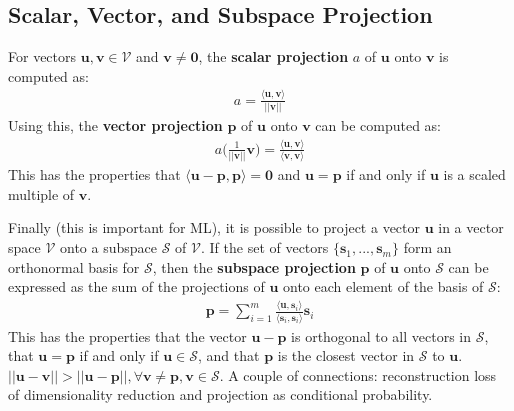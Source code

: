 \documentclass{harvardml}
\theoremstyle{definition}
\theoremstyle{plain}
\renewcommand{\v}[1]{\mathbf{#1}}
\begin{document}
    \subsection{Scalar, Vector, and Subspace Projection}
        For vectors $\v u, \v v \in \mathcal{V}$ and $\v v \neq \v 0$, the 
        \textbf{scalar projection} $a$ of $\v u$ onto $\v v$ is computed as:
            \begin{align*}
                a = \frac{\langle \v u, \v v \rangle}{||\v v||}
            \end{align*}
        \noindent Using this, the \textbf{vector projection} 
		$\v p$ of $\v u$ onto $\v v$ can be computed as:
            \begin{align*}
                a\big(\frac{1}{||\v v||}\v v\big) = 
                \frac{\langle \v u, \v v \rangle}
				{\langle \v v, \v v \rangle}
            \end{align*}
        \noindent This has the properties that $\langle \v u - \v p,
		\v p \rangle = \v 0$ and $\v u = \v p$ if and only if $\v u$ 
		is a scaled multiple of $\v v$.

        \noindent Finally (this is important for ML), it is possible
        to project a vector $\v u$ in a vector space $\mathcal{V}$ onto a
        subspace  $\mathcal{S}$ of $\mathcal{V}$. If the set of vectors
        $\{\v s_1,...,\v s_m\}$ form an orthonormal basis for $\mathcal{S}$,
        then the \textbf{subspace projection} $\v p$ of $\v u$ onto 
		$\mathcal{S}$ can be expressed as the sum of the projections of 
		$\v u$ onto each element of the basis of $\mathcal{S}$:
            \begin{align*}
                \v p = \sum_{i=1}^m 
				\frac{\langle \v u, \v s_i \rangle}
                {\langle \v s_i, \v s_i \rangle} \v s_i
            \end{align*}
        \noindent This has the properties that the vector 
		$\v u - \v p$ is orthogonal to all vectors in $\mathcal{S}$, 
		that $\v u = \v p$ if and only if $\v u \in \mathcal{S}$, and 
		that $\v p$ is the closest vector in $\mathcal{S}$ to $\v u$.
        $|| \v u - \v v || > || \v u - \v p ||, \forall \v v \neq \v p, 
		\v v \in \mathcal{S}$. A couple of connections: reconstruction 
		loss of dimensionality reduction and projection as conditional 
		probability.
\end{document}
